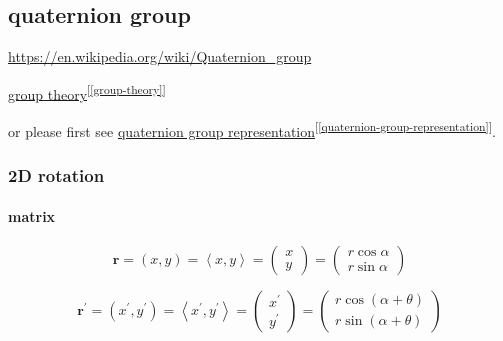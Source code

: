 \documentclass[
]{book}
\theoremstyle{definition}
\theoremstyle{definition}
\theoremstyle{definition}
\theoremstyle{definition}
\theoremstyle{remark}
\begin{document}
\subsection{quaternion group}\label{quaternion-group}

\url{https://en.wikipedia.org/wiki/Quaternion_group}

\hyperref[group-theory]{group theory}\textsuperscript{{[}\ref{group-theory}{]}}

or please first see \hyperref[quaternion-group-representation]{quaternion group representation}\textsuperscript{{[}\ref{quaternion-group-representation}{]}}.

\subsubsection{2D rotation}\label{d-rotation}

\paragraph{matrix}\label{matrix-1}

\[
\boldsymbol{r}=\left(x,y\right)=\left\langle x,y\right\rangle =\begin{pmatrix}x\\
y
\end{pmatrix}=\begin{pmatrix}r\cos\alpha\\
r\sin\alpha
\end{pmatrix}
\]

\[
\boldsymbol{r}^{\prime}=\left(x^{\prime},y^{\prime}\right)=\left\langle x^{\prime},y^{\prime}\right\rangle =\begin{pmatrix}x^{\prime}\\
y^{\prime}
\end{pmatrix}=\begin{pmatrix}r\cos\left(\alpha+\theta\right)\\
r\sin\left(\alpha+\theta\right)
\end{pmatrix}
\]
\end{document}
